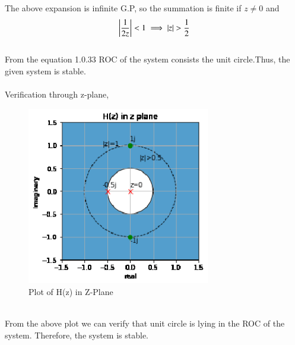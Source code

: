 \documentclass[journal,12pt,twocolumn]{IEEEtran}
\begin{document}
The above expansion is infinite G.P, so the summation is finite if $z\neq0$ and\\
\begin{align}
\left\vert\frac{1}{2z}\right\vert<1 \implies \left\vert z\right\vert>\frac{1}{2}
\end{align}\\
From the equation 1.0.33 ROC of the system consists the unit circle.Thus, the given system is stable.\\
\\
Verification through z-plane,\\
\begin{figure}[h!]
    \centering
    \includegraphics[width=8cm]{./figures/ROC.eps}
    \caption{Plot of H(z) in Z-Plane}
    \label{yn}
\end{figure} \\
From the above plot we can verify that unit circle is lying in the ROC of the system.
Therefore, the system is stable. 
\end{document}
